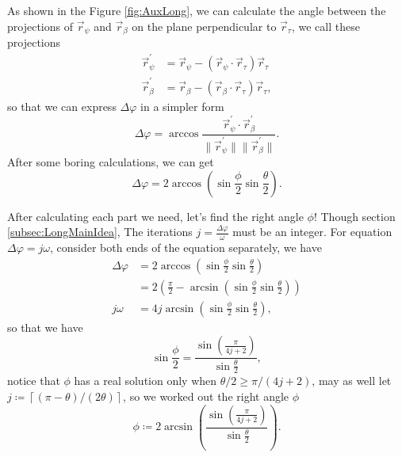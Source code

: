 \documentclass[a4paper,10pt]{book}
\numberwithin{equation}{section}
\begin{document}
As shown in the Figure \ref{fig:AuxLong}, we can calculate the angle between the projections of $\vec{r}_{\psi}$ and $\vec{r}_{\beta}$ on the plane perpendicular to $\vec{r}_{\tau}$, we call these projections
\begin{equation}
    \begin{split}
        \vec{r}_{\psi}^{'}  & =\vec{r}_{\psi}-(\vec{r}_{\psi}\cdot\vec{r}_{\tau})\vec{r}_{\tau}    \\
        \vec{r}_{\beta}^{'} & =\vec{r}_{\beta}-(\vec{r}_{\beta}\cdot\vec{r}_{\tau})\vec{r}_{\tau},
    \end{split}
\end{equation}
so that we can express $\Delta\varphi$ in a simpler form
\begin{equation}
    \Delta\varphi=\arccos\frac{\vec{r}_{\psi}^{'}\cdot\vec{r}_{\beta}^{'}}{\|\vec{r}_{\psi}^{'}\|\|\vec{r}_{\beta}^{'}\|}.
\end{equation}
After some boring calculations, we can get
\begin{equation}
    \Delta\varphi=2\arccos(\sin\frac{\phi}{2}\sin\frac{\theta}{2}).
\end{equation}

After calculating each part we need, let's find the right angle $\phi$! Though section \ref{subsec:LongMainIdea}, The iterations $j=\frac{\Delta\varphi}{\omega}$ must be an integer. For equation $\Delta\varphi=j\omega$, consider both ends of the equation separately, we have
\begin{equation}
    \begin{split}
        \Delta\varphi & = 2\arccos(\sin\frac{\phi}{2}\sin\frac{\theta}{2})                            \\
                      & = 2\left(\frac{\pi}{2}-\arcsin(\sin\frac{\phi}{2}\sin\frac{\theta}{2})\right) \\
        j\omega       & = 4j\arcsin(\sin\frac{\phi}{2}\sin\frac{\theta}{2}),
    \end{split}
\end{equation}
so that we have
\begin{equation}
    \sin\frac{\phi}{2} = \frac{\sin\left(\frac{\pi}{4j+2}\right)}{\sin\frac{\theta}{2}},
\end{equation}
notice that $\phi$ has a real solution only when $\theta/2\geq\pi/(4j+2)$, may as well let $j\coloneqq\left\lceil(\pi-\theta)/(2\theta) \right\rceil$, so we worked out the right angle $\phi$
\begin{equation}
    \phi\coloneqq 2\arcsin\left(\frac{\sin\left(\frac{\pi}{4j+2}\right)}{\sin\frac{\theta}{2}}\right).
\end{equation}
\end{document}
